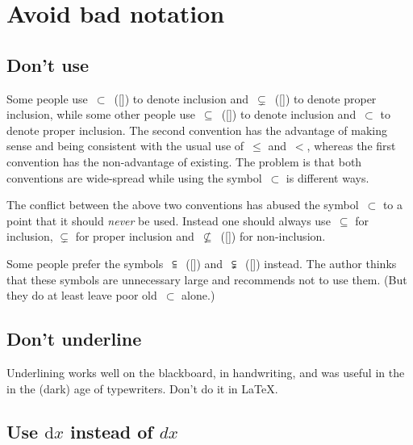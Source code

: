 




\section{Avoid bad notation}



\subsection{Don’t use }

Some people use~$\subset$~([\comname]) to denote inclusion and~$\subsetneq$~([\comname]) to denote proper inclusion, while some other people use~$\subseteq$~([\comname]) to denote inclusion and~$\subset$ to denote proper inclusion.
The second convention has the advantage of making sense and being consistent with the usual use of~$\leq$ and~$<$, whereas the first convention has the non-advantage of existing.
The problem is that both conventions are wide-spread while using the symbol~$\subset$ is different ways.

The conflict between the above two conventions has abused the symbol~$\subset$ to a point that it should \emph{never} be used.
Instead one should always use~$\subseteq$ for inclusion, $\subsetneq$ for proper inclusion and~$\nsubseteq$~([\comname]) for non-inclusion.

Some people prefer the symbols~$\subseteqq$~([\comname]) and~$\subsetneqq$~([\comname]) instead.
The author thinks that these symbols are unnecessary large and recommends not to use them.
(But they do at least leave poor old~$\subset$ alone.)



\subsection{Don’t underline}

Underlining works well on the blackboard, in handwriting, and was useful in the in the (dark) age of typewriters.
Don’t do it in {\LaTeX}.



\subsection{Use \texorpdfstring{$\mathrm{d}x$}{dx} instead of \texorpdfstring{$dx$}{dx}}

